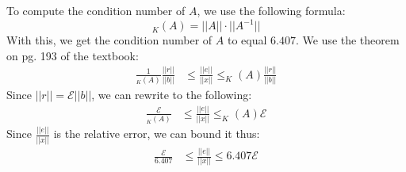 To compute the condition number of $A$, we use the following formula:
$$
_K(A) = ||A|| \cdot ||A^{-1}||
$$
With this, we get the condition number of $A$ to equal $6.407$. We use the theorem on pg. 193 of the textbook:
\begin{align*}
  \frac{1}{_K(A)}\frac{||r||}{||b||} &\leq \frac{||e||}{||x||} \leq _K(A) \frac{||r||}{||b||}
\end{align*}
Since $||r|| = \mathcal{E} ||b||$, we can rewrite to the following:
\begin{align*}
  \frac{\mathcal{E}}{_K(A)} &\leq \frac{||e||}{||x||} \leq _K(A)\mathcal{E}
\end{align*}
Since $\frac{||e||}{||x||}$ is the relative error, we can bound it thus:
\begin{align*}
  \frac{\mathcal{E}}{6.407} &\leq \frac{||e||}{||x||} \leq 6.407\mathcal{E}
\end{align*}

